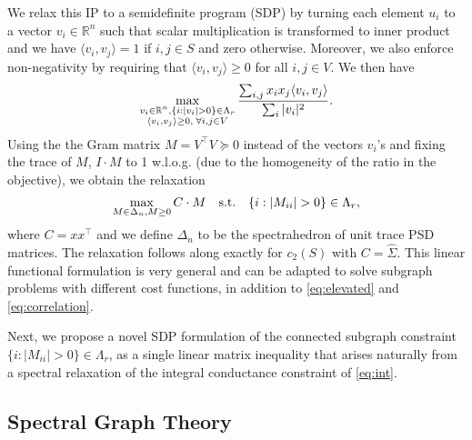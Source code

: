\documentclass{article}
\begin{document}
We relax this IP to a semidefinite program (SDP) by turning each element $u_i$ to a vector $v_i \in \mathbb{R}^n$ such that scalar multiplication is transformed to inner product and we have $\langle v_i, v_j \rangle = 1$ if $i,j \in S$ and zero otherwise. Moreover, we also enforce non-negativity by requiring that $\langle v_i, v_j \rangle \geq 0$ for all $i,j \in V$. 
%
We then have
\begin{equation}\label{eq:original_v}
  \max_{\begin{subarray}{c} v_i \in \mathbb{R}^n, \{i: |v_i| > 0\} \in \Lambda_r\\
  \langle v_i, v_j\rangle \geq 0, \; \forall i,j \in V 
   \end{subarray}}
   \frac{\sum_{i,j} x_i x_j \langle v_i, v_j \rangle}{\sum_i |v_i|^2}.
\end{equation}
Using the the Gram matrix $M = V^\top V \succeq 0$ instead of the vectors $v_i$'s and fixing the trace of $M$, $I \cdot M$ to 1 w.l.o.g. (due to the homogeneity of the ratio in the objective), we obtain the relaxation
\begin{equation}\label{eq:M}
  \max_{\begin{subarray}{c}
    M \in \Delta_n, M \geq 0 \\
  \end{subarray}}
  C \cdot M \quad \mathrm{s.t.} \quad \{i: |M_{ii}| > 0\} \in \Lambda_r,
\end{equation}
where $C = x x^\top$ and we define $\Delta_n$ to be the spectrahedron of unit trace PSD matrices. The relaxation follows along exactly for $c_2(S)$ with $C = \hat{\Sigma}$. This linear functional formulation is very general and can be adapted to solve subgraph problems with different cost functions, in addition to \eqref{eq:elevated} and \eqref{eq:correlation}.


Next, we propose a novel SDP formulation of the connected subgraph constraint $\{i: |M_{ii}| > 0\} \in \Lambda_r$, as a single linear matrix inequality that arises naturally from a spectral relaxation of the integral conductance constraint of \eqref{eq:int}. 

\subsection{Spectral Graph Theory} 
\end{document}
